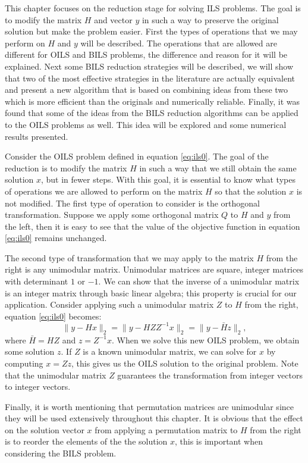 \documentclass[12pt,Bold,letterpaper]{mcgilletdclass}
\begin{document}
This chapter focuses on the reduction stage for solving ILS problems. The goal is to modify the matrix $H$ and vector $y$ in such a way to preserve the original solution but make the problem easier. First the types of operations that we may perform on $H$ and $y$ will be described. The operations that are allowed are different for OILS and BILS problems, the difference and reason for it will be explained. Next some BILS reduction strategies will be described, we will show that two of the most effective strategies in the literature are actually equivalent and present a new algorithm that is based on combining ideas from these two which is more efficient than the originals and numerically reliable. Finally, it was found that some of the ideas from the BILS reduction algorithms can be applied to the OILS problems as well. This idea will be explored and some numerical results presented.

Consider the OILS problem defined in equation \eqref{eq:ils0}. The goal of the reduction is to modify the matrix $H$ in such a way that we still obtain the same solution $x$, but in fewer steps. With this goal, it is essential to know what types of operations we are allowed to perform on the matrix $H$ so that the solution $x$ is not modified. The first type of operation to consider is the orthogonal transformation. Suppose we apply some orthogonal matrix $Q$ to $H$ and $y$ from the left, then it is easy to see that the value of the objective function in equation \eqref{eq:ils0} remains unchanged. 

The second type of transformation that we may apply to the matrix $H$ from the right is any unimodular matrix. Unimodular matrices are square, integer matrices with determinant $1$ or $-1$. We can show that the inverse of a unimodular matrix is an integer matrix through basic linear algebra; this property is crucial for our application. Consider applying such a unimodular matrix $Z$ to $H$ from the right, equation \eqref{eq:ils0} becomes: 
$$
\| y - Hx  \|_2 = \| y - HZZ^{-1}x  \|_2 = \| y - \bar{H}z \|_2,
$$
where $\bar{H} = HZ$ and $z = Z^{-1}x$. When we solve this new OILS problem, we obtain some solution $z$. If $Z$ is a known unimodular matrix, we can solve for $x$ by computing $x = Zz$, this gives us the OILS solution to the original problem. Note that the unimodular matrix $Z$ guarantees the transformation from integer vectors to integer vectors.

Finally, it is worth mentioning that permutation matrices are unimodular since they will be used extensively throughout this chapter. It is obvious that the effect on the solution vector $x$ from applying a permutation matrix to $H$ from the right is to reorder the elements of the the solution $x$, this is important when considering the BILS problem.
\end{document}

